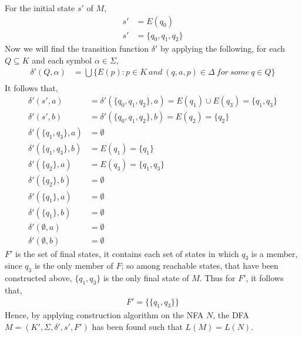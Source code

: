 \documentclass[12pt]{article}
\begin{document}
For the initial state $s'$ of $M$,
\begin{equation*}
    \begin{split}
        s' & = E(q_0)\\
        s' & = \{q_0, q_1, q_2\}
    \end{split}
\end{equation*}
Now we will find the transition function $\delta'$ by applying the following, for each $Q \subseteq K$ and each symbol $\alpha \in \Sigma$,
\begin{equation*}
    \begin{split}
        \delta'(Q, \alpha) & = \bigcup \{E(p) : p \in K \ and \ (q, a, p) \in \Delta \ for \ some \ q \in Q\} \\
    \end{split}
\end{equation*}
It follows that,
\begin{equation*}
    \begin{split}
        \delta'(s', a) & = \delta'(\{q_0, q_1, q_2\}, a) = E(q_1) \cup E(q_3) = \{q_1, q_3\} \\
        \delta'(s', b) & = \delta'(\{q_0, q_1, q_2\}, b) = E(q_2) = \{q_2\} \\
        \delta'(\{q_1, q_3\}, a) & = \emptyset \\
        \delta'(\{q_1, q_3\}, b) & = E(q_1) = \{q_1\} \\
        \delta'(\{q_2\}, a) & = E(q_3) = \{q_1, q_3\} \\
        \delta'(\{q_2\}, b) & = \emptyset \\
        \delta'(\{q_1\}, a) & = \emptyset \\
        \delta'(\{q_1\}, b) & = \emptyset \\
        \delta'(\emptyset, a) & = \emptyset \\
        \delta'(\emptyset, b) & = \emptyset
    \end{split}
\end{equation*}
$F'$ is the set of final states, it contains each set of states in which $q_3$ is a member, since $q_3$ is the only member of $F$; so among reachable states, that have been constructed above, $\{q_1, q_3\}$ is the only final state of $M$. Thus for $F'$, it follows that,
\begin{equation*}
    \begin{split}
        F' = \{\{q_1, q_3\}\}
    \end{split}
\end{equation*}
Hence, by applying construction algorithm on the NFA $N$, the DFA $M = (K', \Sigma, \delta', s', F')$ has been found such that $L(M) = L(N)$. \\
\end{document}
